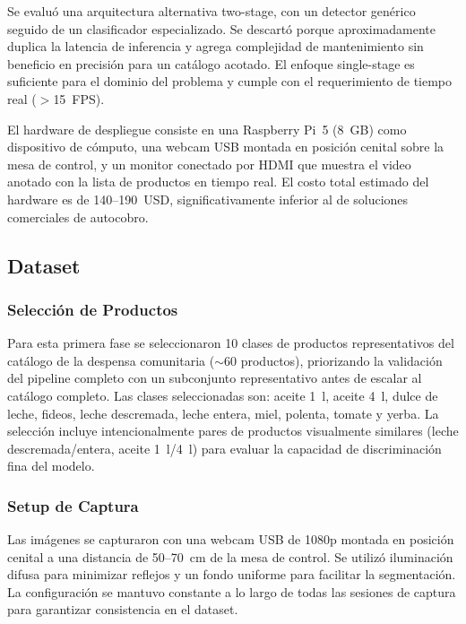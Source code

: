 \documentclass[conference,a4paper]{IEEEtran}[2015/08/26]
\begin{document}
Se evaluó una arquitectura alternativa two-stage, con un detector genérico seguido de un clasificador especializado. Se descartó porque aproximadamente duplica la latencia de inferencia y agrega complejidad de mantenimiento sin beneficio en precisión para un catálogo acotado. El enfoque single-stage es suficiente para el dominio del problema y cumple con el requerimiento de tiempo real ($>$15~FPS).

El hardware de despliegue consiste en una Raspberry Pi~5 (8~GB) como dispositivo de cómputo, una webcam USB montada en posición cenital sobre la mesa de control, y un monitor conectado por HDMI que muestra el video anotado con la lista de productos en tiempo real. El costo total estimado del hardware es de 140--190~USD, significativamente inferior al de soluciones comerciales de autocobro.

\subsection{Dataset}
\label{subsec:dataset}

\subsubsection{Selección de Productos}

Para esta primera fase se seleccionaron 10 clases de productos representativos del catálogo de la despensa comunitaria ($\sim$60 productos), priorizando la validación del pipeline completo con un subconjunto representativo antes de escalar al catálogo completo. Las clases seleccionadas son: aceite 1~l, aceite 4~l, dulce de leche, fideos, leche descremada, leche entera, miel, polenta, tomate y yerba. La selección incluye intencionalmente pares de productos visualmente similares (leche descremada/entera, aceite 1~l/4~l) para evaluar la capacidad de discriminación fina del modelo.

\subsubsection{Setup de Captura}

Las imágenes se capturaron con una webcam USB de 1080p montada en posición cenital a una distancia de 50--70~cm de la mesa de control. Se utilizó iluminación difusa para minimizar reflejos y un fondo uniforme para facilitar la segmentación. La configuración se mantuvo constante a lo largo de todas las sesiones de captura para garantizar consistencia en el dataset.
\end{document}
